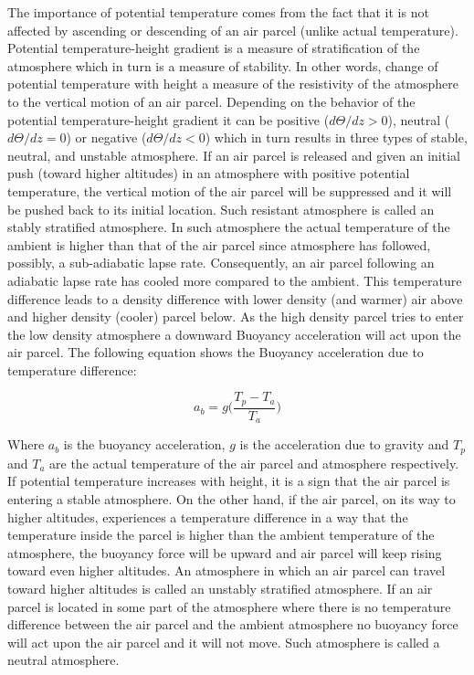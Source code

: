 \documentclass[a4paper,12pt]{article}
\numberwithin{equation}{section} %
\begin{document}
The importance of potential temperature comes from the fact that it is not affected by ascending or descending of an air parcel (unlike actual temperature). Potential temperature-height gradient is a measure of stratification of the atmosphere which in turn is a measure of stability. In other words, change of potential temperature with height a measure of the resistivity of the atmosphere to the vertical motion of an air parcel. Depending on the behavior of the potential temperature-height gradient it can be positive ($d\Theta/dz > 0$), neutral ($d\Theta/dz = 0$) or negative ($d\Theta/dz < 0$) which in turn results in three types of stable, neutral, and unstable atmosphere. If an air parcel is released and given an initial push (toward higher altitudes) in an atmosphere with positive potential temperature, the vertical motion of the air parcel will be suppressed and it will be pushed back to its initial location. Such resistant atmosphere is called an stably stratified atmosphere. In such atmosphere the actual temperature of the ambient is higher than that of the air parcel since atmosphere has followed, possibly, a sub-adiabatic lapse rate. Consequently, an air parcel following an adiabatic lapse rate has cooled more compared to the ambient. This temperature difference leads to a density difference with lower density (and warmer) air above and higher density (cooler) parcel below. As the high density parcel tries to enter the low density atmosphere a downward Buoyancy acceleration will act upon the air parcel. The following equation shows the Buoyancy acceleration due to temperature difference:

\vspace{0.5cm}
\begin{equation}\label{eq:2}
a_b = g\bigg(\frac{T_p - T_a}{T_a}\bigg)
\end{equation}

\vspace{0.25cm}

Where $a_b$ is the buoyancy acceleration, $g$ is the acceleration due to gravity and $T_p$ and $T_a$ are the actual temperature of the air parcel and atmosphere respectively. If potential temperature increases with height, it is a sign that the air parcel is entering a stable atmosphere. On the other hand, if the air parcel, on its way to higher altitudes, experiences a temperature difference in a way that the temperature inside the parcel is higher than the ambient temperature of the atmosphere, the buoyancy force will be upward and air parcel will keep rising toward even higher altitudes. An atmosphere in which an air parcel can travel toward higher altitudes is called an unstably stratified atmosphere. If an air parcel is located in some part of the atmosphere where there is no temperature difference between the air parcel and the ambient atmosphere no buoyancy force will act upon the air parcel and it will not move. Such atmosphere is called a neutral atmosphere.
\end{document}
